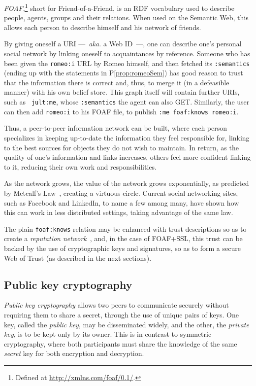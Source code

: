 \documentclass{llncs}
\begin{document}
{\em FOAF},\footnote{Defined at \url{http://xmlns.com/foaf/0.1/}.}
short for Friend-of-a-Friend, is an RDF vocabulary used to describe
people, agents, groups and their relations. When
used on the Semantic Web, this allows each person to describe himself 
and his network of friends.

By giving oneself a URI ---~{\em aka.} a Web ID~---, one can describe one's
personal social network by linking oneself to acquaintances by
reference. 
Someone who has been given the {\tt romeo:i} URL
by Romeo himself, and then fetched its {\tt :semantics} (ending up with the
statements in P\ref{prop:romeoSem}) has
good reason to trust that the information there is correct
and, thus, to merge it (in a defeasible manner) with his own belief
store. This graph itself will contain further URIs, such as {\tt
  jult:me}, whose {\tt :semantics} the agent can also GET. 
Similarly, the user can then add {\tt romeo:i} to his FOAF file, to publish
{\tt :me foaf:knows romeo:i}.

Thus, a peer-to-peer information network can be built, where each person
specializes in keeping up-to-date the information they feel
responsible for, linking to the best sources for objects they
do not wish to maintain. In return, as the quality
of one's information and links increases, others feel more confident
linking to it, reducing their own work and responsibilities.

As the network grows, the
value of the network grows exponentially, as predicted by Metcalf's
Law~\cite{SemWebMetcalf}, creating a virtuous circle.  Current social 
networking sites, such as Facebook and LinkedIn, to name a few among many, 
have shown how this can work in less distributed settings, taking advantage of the same law.

The plain {\tt foaf:knows} relation may be enhanced with trust descriptions so as to create a {\em
  reputation network}~\cite{DBLP:conf/www/GolbeckPH03}, and, in the
case of FOAF+SSL, this trust can be backed by the use of cryptographic
keys and signatures, so as to form a secure Web of Trust (as described
in the next sections).

\subsection{Public key cryptography}

{\em Public key cryptography} allows two peers to communicate securely
without requiring them to share a secret, through
the use of unique pairs of keys.  One key, called the {\em public
  key}, may be disseminated widely, and the other, the {\em private
  key}, is to be kept only by its owner.
This is in contrast to symmetric cryptography, where both
participants must share the knowledge of the same {\em secret} key for
both encryption and decryption.
\end{document}
